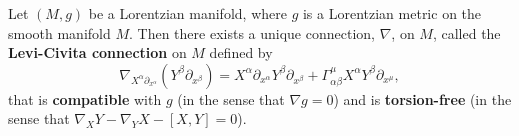 \documentclass{article}
\begin{document}
\begin{definition}
	Let $(M, g)$ be a Lorentzian manifold, where $g$ is a Lorentzian metric on the smooth manifold $M$. Then there exists a unique connection, $\nabla$, on $M$, called the \textbf{Levi-Civita connection} on $M$ defined by 
	\begin{equation*}
		\nabla_{X^{\alpha}\partial_{x^{\alpha}}}(Y^{\beta}\partial_{x^{\beta}})= X^{\alpha}\partial_{x^{\alpha}}Y^{\beta}\partial_{x^{\beta}} + \Gamma^{\mu}_{\alpha\beta}X^{\alpha}Y^{\beta}\partial_{x^{\mu}},
	\end{equation*}
	that is \textbf{compatible} with $g$ (in the sense that $\nabla g = 0$) and is \textbf{torsion-free} (in the sense that $\nabla_{X}Y - \nabla_{Y}X -[X,Y] = 0$). 
\end{definition} 
\end{document}

